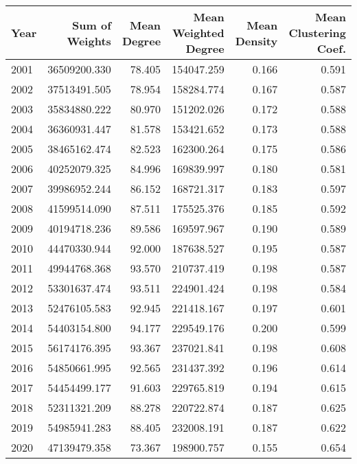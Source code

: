 \begin{tabular}{lrrrrr}
\toprule
Year & Sum of Weights & Mean Degree & Mean Weighted Degree & Mean Density & Mean Clustering Coef. \\
\midrule
2001 &   36509200.330 &      78.405 &           154047.259 &        0.166 &                 0.591 \\
2002 &   37513491.505 &      78.954 &           158284.774 &        0.167 &                 0.587 \\
2003 &   35834880.222 &      80.970 &           151202.026 &        0.172 &                 0.588 \\
2004 &   36360931.447 &      81.578 &           153421.652 &        0.173 &                 0.588 \\
2005 &   38465162.474 &      82.523 &           162300.264 &        0.175 &                 0.586 \\
2006 &   40252079.325 &      84.996 &           169839.997 &        0.180 &                 0.581 \\
2007 &   39986952.244 &      86.152 &           168721.317 &        0.183 &                 0.597 \\
2008 &   41599514.090 &      87.511 &           175525.376 &        0.185 &                 0.592 \\
2009 &   40194718.236 &      89.586 &           169597.967 &        0.190 &                 0.589 \\
2010 &   44470330.944 &      92.000 &           187638.527 &        0.195 &                 0.587 \\
2011 &   49944768.368 &      93.570 &           210737.419 &        0.198 &                 0.587 \\
2012 &   53301637.474 &      93.511 &           224901.424 &        0.198 &                 0.584 \\
2013 &   52476105.583 &      92.945 &           221418.167 &        0.197 &                 0.601 \\
2014 &   54403154.800 &      94.177 &           229549.176 &        0.200 &                 0.599 \\
2015 &   56174176.395 &      93.367 &           237021.841 &        0.198 &                 0.608 \\
2016 &   54850661.995 &      92.565 &           231437.392 &        0.196 &                 0.614 \\
2017 &   54454499.177 &      91.603 &           229765.819 &        0.194 &                 0.615 \\
2018 &   52311321.209 &      88.278 &           220722.874 &        0.187 &                 0.625 \\
2019 &   54985941.283 &      88.405 &           232008.191 &        0.187 &                 0.622 \\
2020 &   47139479.358 &      73.367 &           198900.757 &        0.155 &                 0.654 \\
\bottomrule
\end{tabular}

